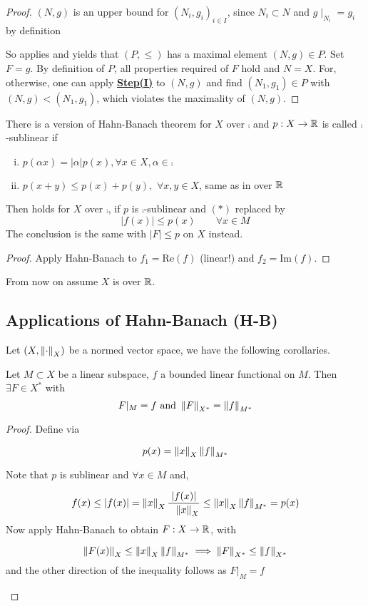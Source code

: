 \documentclass{article}
\begin{document}
\begin{proof}
$(N,g)$ is an upper bound for $(N_i, g_i)_{i \in I}$, since $N_i \subset N$ and $g\mid_{N_i} = g_i$ by definition  

So  applies and yields that $(P, \leq)$ has a maximal element $(N,g)\in P$. Set $F=g$.  
By definition of $P$, all properties required of $F$ hold and $N=X$. For, otherwise, one can apply \underline{\textbf{Step(I)}} to $(N,g)$ and find $(N_1, g_1) \in P$ with $(N,g) < (N_1, g_1)$, which violates the maximality of $(N,g)$.
\end{proof}


\begin{remark}
There is a version of Hahn-Banach theorem for $X$ over $\comp$ and $p: X\to \mathbb{R}$ is called $\comp$-sublinear if  
\begin{enumerate}[i)]
    \item $p(\alpha x) = |\alpha|p(x), \forall x \in X, \alpha \in \comp$
    \item $p(x+y) \leq p(x)+p(y),\,\,\forall x,y\in X$, same as in over $\mathbb{R}$
\end{enumerate}
Then  holds for $X$ over $\comp$, if $p$ is $\comp$-sublinear and $(*)$ replaced by  
$$
|f(x)| \leq p(x) \qquad \forall x \in M
$$  
The conclusion is the same with $|F|\leq p$ on $X$ instead.  
\begin{proof}
    Apply Hahn-Banach to $f_1 = \text{Re}(f)$ (linear!) and $f_2 = \text{Im}(f)$.
\end{proof}
\end{remark}  

From now on assume $X$ is over $\mathbb{R}$.

\subsection{Applications of Hahn-Banach (H-B)}  

Let $(X, \left\|{\cdot}\right\|_X)$ be a normed vector space, we have the following corollaries.  

\begin{corollary}
\label{same norm extension}
Let $M \subset X$ be a linear subspace, $f$ a bounded linear functional on $M$. Then $\exists F \in X^*$ with 
$$F |_M = f \ \text{and} \ \norm{F}_{X^*}=\norm{f}_{M^*}$$
\end{corollary}

\begin{proof}
Define  via  

$$p(x) = \left\|{x}\right\|_X \left\|{f}\right\|_{M^*}$$  

Note that $p$ is sublinear and $\forall x \in M$ and,  

$$f(x) \leq |f(x)|=\left\|{x}\right\|_X \frac{|f(x)|}{\hphantom{x} \left\|{x}\right\|_X} \leq \left\|{x}\right\|_X \left\|{f}\right\|_{M^*}=p(x)$$  
Now apply Hahn-Banach to obtain $F: X \to \mathbb{R}$, with  
\begin{unexaminable}
$$\left\|{F(x)}\right\|_{X} \leq \left\|{x}\right\|_X \left\|{f}\right\|_{M^*} \implies \left\|{F}\right\|_{X^*} \leq \left\|{f}\right\|_{X^*}$$
and the other direction of the inequality follows as $F |_M = f$
\end{unexaminable}
\end{proof}  
\end{document}
